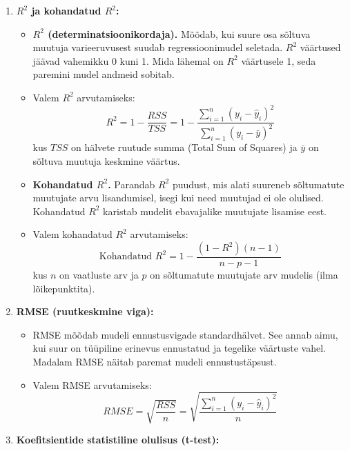\documentclass[
]{book}
\providecommand{\tightlist}{%
  \setlength{\itemsep}{0pt}\setlength{\parskip}{0pt}}
\begin{document}
\begin{enumerate}
\def\labelenumi{\arabic{enumi}.}
\item
  \textbf{\(R^2\) ja kohandatud \(R^2\):}

  \begin{itemize}
  \tightlist
  \item
    \textbf{\(R^2\) (determinatsioonikordaja).} Mõõdab, kui suure osa sõltuva muutuja varieeruvusest suudab regressioonimudel seletada. \(R^2\) väärtused jäävad vahemikku 0 kuni 1. Mida lähemal on \(R^2\) väärtusele 1, seda paremini mudel andmeid sobitab.
  \item
    Valem \(R^2\) arvutamiseks:
    \[R^2 = 1 - \frac{RSS}{TSS} = 1 - \frac{\sum_{i=1}^{n} (y_i - \hat{y}_i)^2}{\sum_{i=1}^{n} (y_i - \bar{y})^2}\]
    kus \(TSS\) on hälvete ruutude summa (Total Sum of Squares) ja \(\bar{y}\) on sõltuva muutuja keskmine väärtus.
  \item
    \textbf{Kohandatud \(R^2\).} Parandab \(R^2\) puudust, mis alati suureneb sõltumatute muutujate arvu lisandumisel, isegi kui need muutujad ei ole olulised. Kohandatud \(R^2\) karistab mudelit ebavajalike muutujate lisamise eest.
  \item
    Valem kohandatud \(R^2\) arvutamiseks:
    \[\text{Kohandatud } R^2 = 1 - \frac{(1-R^2)(n-1)}{n-p-1}\]
    kus \(n\) on vaatluste arv ja \(p\) on sõltumatute muutujate arv mudelis (ilma lõikepunktita).
  \end{itemize}
\item
  \textbf{RMSE (ruutkeskmine viga):}

  \begin{itemize}
  \tightlist
  \item
    RMSE mõõdab mudeli ennustusvigade standardhälvet. See annab aimu, kui suur on tüüpiline erinevus ennustatud ja tegelike väärtuste vahel. Madalam RMSE näitab paremat mudeli ennustustäpsust.
  \item
    Valem RMSE arvutamiseks:
    \[RMSE = \sqrt{\frac{RSS}{n}} = \sqrt{\frac{\sum_{i=1}^{n} (y_i - \hat{y}_i)^2}{n}}\]
  \end{itemize}
\item
  \textbf{Koefitsientide statistiline olulisus (t-test):}


\end{enumerate}
\end{document}
